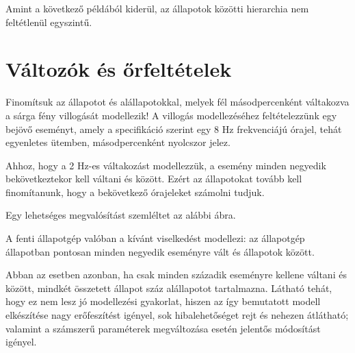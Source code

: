 Amint a következő példából kiderül, az állapotok közötti hierarchia nem feltétlenül egyszintű.

\begin{megjegyzes}
\end{megjegyzes}
 

\section{Változók és őrfeltételek}

Finomítsuk az  állapotot  és  alállapotokkal, melyek fél másodpercenként váltakozva a sárga fény villogását modellezik!
A villogás modellezéséhez feltételezzünk egy  bejövő eseményt, amely a specifikáció szerint egy 8 Hz frekvenciájú órajel, tehát egyenletes ütemben, másodpercenként nyolcszor jelez.

Ahhoz, hogy a 2 Hz-es váltakozást modellezzük, a  esemény minden negyedik bekövetkeztekor kell váltani  és  között. Ezért az állapotokat tovább kell finomítanunk, hogy a bekövetkező órajeleket számolni tudjuk.

Egy lehetséges megvalósítást szemléltet az alábbi ábra.


A fenti állapotgép valóban a kívánt viselkedést modellezi: az állapotgép  állapotban pontosan minden negyedik  eseményre vált  és  állapotok között.

Abban az esetben azonban, ha csak minden századik eseményre kellene váltani  és  között, mindkét összetett állapot száz alállapotot tartalmazna. Látható tehát, hogy ez nem lesz jó modellezési gyakorlat, hiszen az így bemutatott modell elkészítése nagy erőfeszítést igényel, sok hibalehetőséget rejt és nehezen átlátható; valamint a számszerű paraméterek megváltozása esetén jelentős módosítást igényel.

